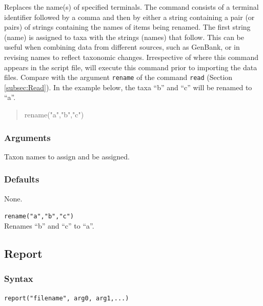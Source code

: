 	\begin{phygdescription}
	{Replaces the name(s) of specified terminals. 
	The command consists of a terminal identifier followed by a comma and then by either 
	a string containing a pair (or pairs) of strings containing the names of items being renamed.
	The first string (name) is assigned to taxa with the strings (names) that follow. This can be 
	useful when combining data from different sources, such as GenBank, or in revising names 
	to reflect taxonomic changes. Irrespective of where this command appears in the script file, 
	\phyg will execute this command prior to importing the data files. Compare with the 
	argument \texttt{rename} of the command \texttt{read} (Section \ref{subsec:Read}).
	In the example below, the taxa ``b'' and ``c'' will be renamed to ``a''.

	\begin{quote}
	rename("a","b","c")
	\end{quote}}
	\end{phygdescription}
	
	\subsubsection{Arguments}
		Taxon names to assign and be assigned.
		
	\subsubsection{Defaults}
		None.
		
	\begin{example}
	
		\item{\texttt{rename("a","b","c")}\\ Renames ``b'' and ``c'' to ``a''. }
				
	\end{example}


\subsection{Report}
	\subsubsection{Syntax}
		\texttt{report("filename", arg0, arg1,...)}
	
